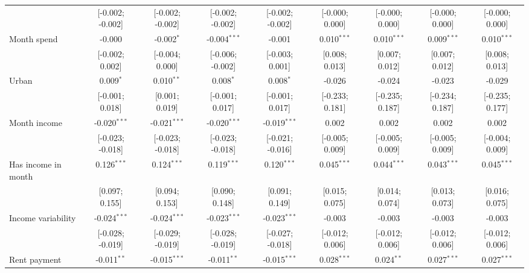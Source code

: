 \begin{table}[htbp]
\begin{threeparttable}[b]
\begin{tabular}{lcccccccc}
                                & [-0.002; -0.002] & [-0.002; -0.002] & [-0.002; -0.002] & [-0.002; -0.002] & [-0.000; 0.000] & [-0.000; 0.000] & [-0.000; 0.000] & [-0.000; 0.000]\\   
         Month spend            & -0.000           & -0.002$^{*}$     & -0.004$^{***}$   & -0.001           & 0.010$^{***}$   & 0.010$^{***}$   & 0.009$^{***}$   & 0.010$^{***}$\\   
                                & [-0.002; 0.002]  & [-0.004; 0.000]  & [-0.006; -0.002] & [-0.003; 0.001]  & [0.008; 0.013]  & [0.007; 0.012]  & [0.007; 0.012]  & [0.008; 0.013]\\   
         Urban                  & 0.009$^{*}$      & 0.010$^{**}$     & 0.008$^{*}$      & 0.008$^{*}$      & -0.026          & -0.024          & -0.023          & -0.029\\   
                                & [-0.001; 0.018]  & [0.001; 0.019]   & [-0.001; 0.017]  & [-0.001; 0.017]  & [-0.233; 0.181] & [-0.235; 0.187] & [-0.234; 0.187] & [-0.235; 0.177]\\   
         Month income           & -0.020$^{***}$   & -0.021$^{***}$   & -0.020$^{***}$   & -0.019$^{***}$   & 0.002           & 0.002           & 0.002           & 0.002\\   
                                & [-0.023; -0.018] & [-0.023; -0.018] & [-0.023; -0.018] & [-0.021; -0.016] & [-0.005; 0.009] & [-0.005; 0.009] & [-0.005; 0.009] & [-0.004; 0.009]\\   
         Has income in month    & 0.126$^{***}$    & 0.124$^{***}$    & 0.119$^{***}$    & 0.120$^{***}$    & 0.045$^{***}$   & 0.044$^{***}$   & 0.043$^{***}$   & 0.045$^{***}$\\   
                                & [0.097; 0.155]   & [0.094; 0.153]   & [0.090; 0.148]   & [0.091; 0.149]   & [0.015; 0.075]  & [0.014; 0.074]  & [0.013; 0.073]  & [0.016; 0.075]\\   
         Income variability     & -0.024$^{***}$   & -0.024$^{***}$   & -0.023$^{***}$   & -0.023$^{***}$   & -0.003          & -0.003          & -0.003          & -0.003\\   
                                & [-0.028; -0.019] & [-0.029; -0.019] & [-0.028; -0.019] & [-0.027; -0.018] & [-0.012; 0.006] & [-0.012; 0.006] & [-0.012; 0.006] & [-0.012; 0.006]\\   
         Rent payment           & -0.011$^{**}$    & -0.015$^{***}$   & -0.011$^{**}$    & -0.015$^{***}$   & 0.028$^{***}$   & 0.024$^{**}$    & 0.027$^{***}$   & 0.027$^{***}$\\   

\end{tabular}
\end{threeparttable}
\end{table}
